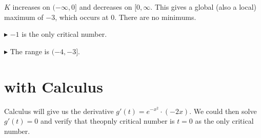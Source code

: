 \documentclass{ximera}
\begin{document}
$K$ increases on $(-\infty, 0]$ and decreases on $[0, \infty$.  This gives a global (also a local) maximum of $-3$, which occurs at $0$.   There are no minimums.


$\blacktriangleright$  $-1$ is the only critical number.


$\blacktriangleright$  The range is $(-4, -3]$.

















\section{with Calculus}

Calculus will give us the derivative $g'(t) = e^{-x^2} \cdot (-2x)$.  We could then solve $g'(t) = 0$ and verify that theopnly critical number is $t = 0$ as the only critical number.
\end{document}

